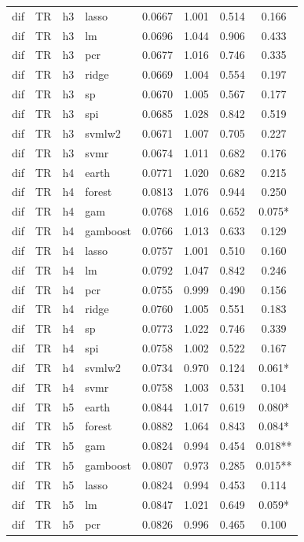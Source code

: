 \begin{ThreePartTable}
\begin{longtable}[t]{llclcccc}
dif & TR & h3 & lasso & 0.0667 & 1.001 & 0.514 & 0.166\\
dif & TR & h3 & lm & 0.0696 & 1.044 & 0.906 & 0.433\\
dif & TR & h3 & pcr & 0.0677 & 1.016 & 0.746 & 0.335\\
dif & TR & h3 & ridge & 0.0669 & 1.004 & 0.554 & 0.197\\
dif & TR & h3 & sp & 0.0670 & 1.005 & 0.567 & 0.177\\
dif & TR & h3 & spi & 0.0685 & 1.028 & 0.842 & 0.519\\
dif & TR & h3 & svmlw2 & 0.0671 & 1.007 & 0.705 & 0.227\\
dif & TR & h3 & svmr & 0.0674 & 1.011 & 0.682 & 0.176\\
\addlinespace
dif & TR & h4 & earth & 0.0771 & 1.020 & 0.682 & 0.215\\
dif & TR & h4 & forest & 0.0813 & 1.076 & 0.944 & 0.250\\
dif & TR & h4 & gam & 0.0768 & 1.016 & 0.652 & 0.075*\\
dif & TR & h4 & gamboost & 0.0766 & 1.013 & 0.633 & 0.129\\
dif & TR & h4 & lasso & 0.0757 & 1.001 & 0.510 & 0.160\\
dif & TR & h4 & lm & 0.0792 & 1.047 & 0.842 & 0.246\\
dif & TR & h4 & pcr & 0.0755 & 0.999 & 0.490 & 0.156\\
dif & TR & h4 & ridge & 0.0760 & 1.005 & 0.551 & 0.183\\
dif & TR & h4 & sp & 0.0773 & 1.022 & 0.746 & 0.339\\
dif & TR & h4 & spi & 0.0758 & 1.002 & 0.522 & 0.167\\
dif & TR & h4 & svmlw2 & 0.0734 & 0.970 & 0.124 & 0.061*\\
dif & TR & h4 & svmr & 0.0758 & 1.003 & 0.531 & 0.104\\
\addlinespace
dif & TR & h5 & earth & 0.0844 & 1.017 & 0.619 & 0.080*\\
dif & TR & h5 & forest & 0.0882 & 1.064 & 0.843 & 0.084*\\
dif & TR & h5 & gam & 0.0824 & 0.994 & 0.454 & 0.018**\\
dif & TR & h5 & gamboost & 0.0807 & 0.973 & 0.285 & 0.015**\\
dif & TR & h5 & lasso & 0.0824 & 0.994 & 0.453 & 0.114\\
dif & TR & h5 & lm & 0.0847 & 1.021 & 0.649 & 0.059*\\
dif & TR & h5 & pcr & 0.0826 & 0.996 & 0.465 & 0.100\\

\end{longtable}
\end{ThreePartTable}
